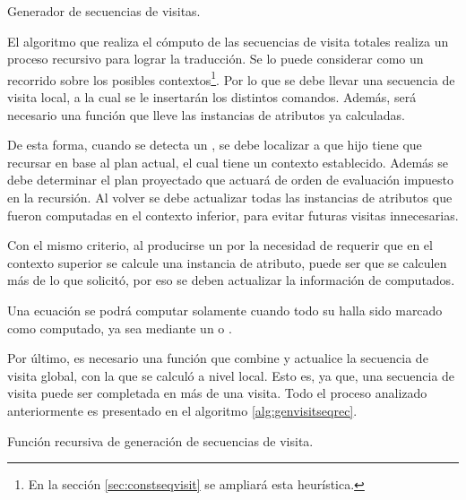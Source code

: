 \begin{algorithm}[!ht]

\vspace{-0.5cm}
\caption{\label{alg:genvisitseq}Generador de secuencias de visitas.}
\end{algorithm}

El algoritmo que realiza el cómputo de las secuencias de visita totales realiza un proceso recursivo para lograr la traducción. Se lo puede considerar como un recorrido sobre los posibles contextos\footnote{En la sección \ref{sec:constseqvisit} se ampliará esta heurística.}. Por lo que se debe llevar una secuencia de visita local, a la cual se le insertarán los distintos comandos. Además, será necesario una función que lleve las instancias de atributos ya calculadas.

De esta forma, cuando se detecta un , se debe localizar a que hijo tiene que recursar en base al plan actual, el cual tiene un contexto establecido. Además se debe determinar el plan proyectado que actuará de orden de e\-va\-lua\-ción impuesto en la recursión. Al volver se debe actualizar todas las instancias de atributos que fueron computadas en el contexto inferior, para evitar futuras visitas innecesarias.

Con el mismo criterio, al producirse un  por la necesidad de requerir que en el contexto superior se calcule una instancia de atributo, puede ser que se calculen más de lo que solicitó, por eso se deben actualizar la información de computados.

Una ecuación se podrá computar solamente cuando todo su  halla sido marcado como computado, ya sea mediante un  o .

Por último, es necesario una función que combine y actualice la secuencia de visita global, con la que se calculó a nivel local. Esto es, ya que, una secuencia de visita puede ser completada en más de una visita. Todo el proceso analizado anteriormente es presentado en el algoritmo \ref{alg:genvisitseqrec}.

\begin{algorithm}[!ht]

\vspace{-0.5cm}
\caption{\label{alg:genvisitseqrec}Función recursiva de generación de secuencias de visita.}
\end{algorithm}

